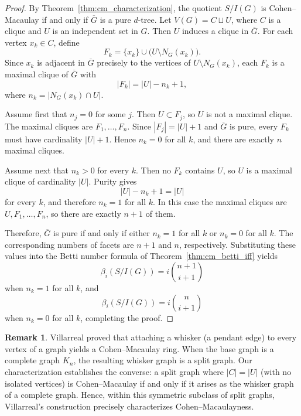 \documentclass[12pt, reqno]{amsart}
\theoremstyle{definition}
\newtheorem{remark}[theorem]{Remark}
\numberwithin{equation}{section}
\begin{document}
	\begin{proof}
		By Theorem~\ref{thm:cm_characterization}, the quotient $S/I(G)$ is Cohen--Macaulay if and only if $\overline{G}$ is a pure $d$-tree. Let $V(G)=C\sqcup U$, where $C$ is a clique and $U$ is an independent set in $G$. Then $U$ induces a clique in $\overline{G}$. For each vertex $x_k\in C$, define
		\[
		F_k=\{x_k\}\cup\bigl(U\setminus N_G(x_k)\bigr).
		\]
		Since $x_k$ is adjacent in $\overline{G}$ precisely to the vertices of $U\setminus N_G(x_k)$, each $F_k$ is a maximal clique of $\overline{G}$ with
		\[
		|F_k|=|U|-n_k+1,
		\]
		where $n_k=|N_G(x_k)\cap U|$.
		
		Assume first that $n_j=0$ for some $j$. Then $U\subset F_j$, so $U$ is not a maximal clique. The maximal cliques are $F_1,\ldots,F_n$. Since $|F_j|=|U|+1$ and $\overline G$ is pure, every $F_k$ must have cardinality $|U|+1$. Hence $n_k=0$ for all $k$, and there are exactly $n$ maximal cliques.
		
		Assume next that $n_k>0$ for every $k$. Then no $F_k$ contains $U$, so $U$ is a maximal clique of cardinality $|U|$. Purity gives
		\[
		|U|-n_k+1=|U|
		\]
		for every $k$, and therefore $n_k=1$ for all $k$. In this case the maximal cliques are $U,F_1,\ldots,F_n$, so there are exactly $n+1$ of them.
		
		Therefore, $\overline{G}$ is pure if and only if either $n_k=1$ for all $k$ or $n_k=0$ for all $k$. The corresponding numbers of facets are $n+1$ and $n$, respectively. Substituting these values into the Betti number formula of Theorem~\ref{thm:cm_betti_iff} yields
		\[
		\beta_i(S/I(G))=i\binom{n+1}{i+1}
		\]
		when $n_k=1$ for all $k$, and
		\[
		\beta_i(S/I(G))=i\binom{n}{i+1}
		\]
		when $n_k=0$ for all $k$, completing the proof.
	\end{proof}
	
	\begin{remark}
		Villarreal \cite{villarreal1990} proved that attaching a whisker (a pendant edge) to every vertex of a graph yields a Cohen--Macaulay ring. When the base graph is a complete graph $K_n$, the resulting whisker graph is a split graph. Our characterization establishes the converse: a split graph where $|C| = |U|$ (with no isolated vertices) is Cohen--Macaulay if and only if it arises as the whisker graph of a complete graph. Hence, within this symmetric subclass of split graphs, Villarreal's construction precisely characterizes Cohen--Macaulayness.
	\end{remark}
	
\end{document}
